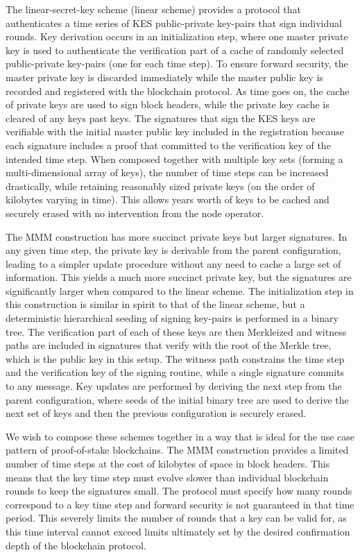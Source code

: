 \documentclass{article}
\begin{document}
 The linear-secret-key scheme (linear scheme) provides a protocol that authenticates a time series of KES public-private key-pairs that sign individual rounds.  
  Key derivation occurs in an initialization step, where one master private key is used to authenticate the verification part of a cache of randomly selected public-private key-pairs (one for each time step).  
To ensure forward security, the master private key is discarded immediately while the master public key is recorded and registered with the blockchain protocol. 
 As time goes on, the cache of private keys are used to sign block headers, while the private key cache is cleared of any keys past keys.
 The signatures that sign the KES keys are verifiable with the initial master public key included in the registration because each signature includes a proof that committed to the verification key of the intended time step.  When composed together with multiple key sets (forming a multi-dimensional array of keys), the number of time steps can be increased drastically, while retaining reasonably sized private keys (on the order of kilobytes varying in time).
 This allows years worth of keys to be cached and securely erased with no intervention from the node operator.
 
 The MMM construction has more succinct private keys but larger signatures.  In any given time step, the private key is derivable from the parent configuration, leading to a simpler update procedure without any need to cache a large set of information.  This yields a much more succinct private key, but the signatures are significantly larger when compared to the linear scheme.  The initialization step in this construction is similar in spirit to that of the linear scheme, but a deterministic hierarchical seeding of signing key-pairs is performed in a binary tree.  The verification part of each of these keys are then Merkleized and witness paths are included in signatures that verify with the root of the Merkle tree, which is the public key in this setup.  The witness path constrains the time step and the verification key of the signing routine, while a single signature commits to any message.  Key updates are performed by deriving the next step from the parent configuration, where seeds of the initial binary tree are used to derive the next set of keys and then the previous configuration is securely erased.
 
 We wish to compose these schemes together in a way that is ideal for the use case pattern of proof-of-stake blockchains.  The MMM construction provides a limited number of time steps at the cost of kilobytes of space in block headers.  This means that the key time step must evolve slower than individual blockchain rounds to keep the signatures small. The protocol must specify how many rounds correspond to a key time step and forward security is not guaranteed in that time period.  This severely limits the number of rounds that a key can be valid for, as this time interval cannot exceed limits ultimately set by the desired confirmation depth of the blockchain protocol.
\end{document}
